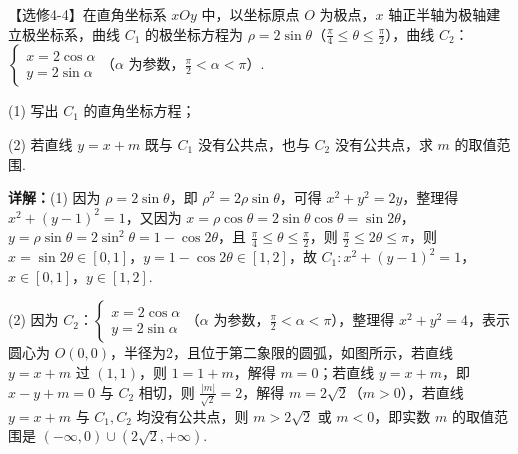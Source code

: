 \begin{question}[points=10]
【选修4-4】在直角坐标系 $xOy$ 中，以坐标原点 $O$ 为极点，$x$ 轴正半轴为极轴建立极坐标系，曲线 $C_1$ 的极坐标方程为 $\rho=2\sin\theta$（$\frac{\pi}{4}\le\theta\le\frac{\pi}{2}$），曲线 $C_2$：$\begin{cases} x=2\cos\alpha \\ y=2\sin\alpha \end{cases}$（$\alpha$ 为参数，$\frac{\pi}{2}<\alpha<\pi$）.



(1) 写出 $C_1$ 的直角坐标方程；



(2) 若直线 $y=x+m$ 既与 $C_1$ 没有公共点，也与 $C_2$ 没有公共点，求 $m$ 的取值范围.
\begin{solution}

\textbf{详解：}(1) 因为 $\rho=2\sin\theta$，即 $\rho^2=2\rho\sin\theta$，可得 $x^2+y^2=2y$，整理得 $x^2+(y-1)^2=1$，又因为 $x=\rho\cos\theta=2\sin\theta\cos\theta=\sin2\theta$，$y=\rho\sin\theta=2\sin^2\theta=1-\cos2\theta$，且 $\frac{\pi}{4}\le\theta\le\frac{\pi}{2}$，则 $\frac{\pi}{2}\le2\theta\le\pi$，则 $x=\sin2\theta\in[0,1]$，$y=1-\cos2\theta\in[1,2]$，故 $C_1: x^2+(y-1)^2=1$，$x\in[0,1]$，$y\in[1,2]$.

(2) 因为 $C_2$：$\begin{cases} x=2\cos\alpha \\ y=2\sin\alpha \end{cases}$（$\alpha$ 为参数，$\frac{\pi}{2}<\alpha<\pi$），整理得 $x^2+y^2=4$，表示圆心为 $O(0,0)$，半径为2，且位于第二象限的圆弧，如图所示，若直线 $y=x+m$ 过 $(1,1)$，则 $1=1+m$，解得 $m=0$；若直线 $y=x+m$，即 $x-y+m=0$ 与 $C_2$ 相切，则 $\frac{|m|}{\sqrt{2}}=2$，解得 $m=2\sqrt{2}$（$m>0$），若直线 $y=x+m$ 与 $C_1,C_2$ 均没有公共点，则 $m>2\sqrt{2}$ 或 $m<0$，即实数 $m$ 的取值范围是 $(-\infty,0)\cup(2\sqrt{2},+\infty)$.
\end{solution}
\end{question}

